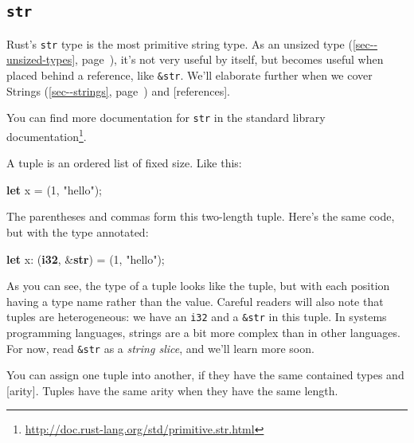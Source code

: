 \documentclass[a4paper,]{book}
\renewcommand*{\hyperref}[2][\ar]{%
  \def\ar{#2}%
  #2 (\autoref{#1}, page~\pageref{#1})}
\newenvironment{Shaded}{\begin{snugshade}}{\end{snugshade}}
\newcommand{\KeywordTok}[1]{\textcolor[rgb]{0.13,0.29,0.53}{\textbf{{#1}}}}
\newcommand{\DecValTok}[1]{\textcolor[rgb]{0.00,0.00,0.81}{{#1}}}
\newcommand{\StringTok}[1]{\textcolor[rgb]{0.31,0.60,0.02}{{#1}}}
\newcommand{\NormalTok}[1]{{#1}}
\renewcommand{\href}[2]{#2\footnote{\url{#1}}}
\begin{document}
\subsection{\texorpdfstring{\texttt{str}}{str}}\label{str}

Rust's \texttt{str} type is the most primitive string type. As an
\hyperref[sec--unsized-types]{unsized type}, it's not very useful by
itself, but becomes useful when placed behind a reference, like
\texttt{\&str}. We'll elaborate further when we cover
\hyperref[sec--strings]{Strings} and {[}references{]}.

You can find more documentation for \texttt{str}
\href{http://doc.rust-lang.org/std/primitive.str.html}{in the standard
library documentation}.


A tuple is an ordered list of fixed size. Like this:

\begin{Shaded}
\begin{Highlighting}[]
\KeywordTok{let} \NormalTok{x = (}\DecValTok{1}\NormalTok{, }\StringTok{"hello"}\NormalTok{);}
\end{Highlighting}
\end{Shaded}

The parentheses and commas form this two-length tuple. Here's the same
code, but with the type annotated:

\begin{Shaded}
\begin{Highlighting}[]
\KeywordTok{let} \NormalTok{x: (}\KeywordTok{i32}\NormalTok{, &}\KeywordTok{str}\NormalTok{) = (}\DecValTok{1}\NormalTok{, }\StringTok{"hello"}\NormalTok{);}
\end{Highlighting}
\end{Shaded}

As you can see, the type of a tuple looks like the tuple, but with each
position having a type name rather than the value. Careful readers will
also note that tuples are heterogeneous: we have an \texttt{i32} and a
\texttt{\&str} in this tuple. In systems programming languages, strings
are a bit more complex than in other languages. For now, read
\texttt{\&str} as a \emph{string slice}, and we'll learn more soon.

You can assign one tuple into another, if they have the same contained
types and {[}arity{]}. Tuples have the same arity when they have the
same length.
\end{document}
